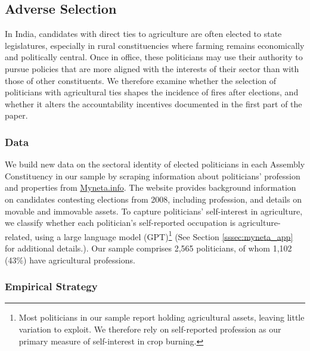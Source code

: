 \documentclass[12pt]{article}
\begin{document}
 \subsection{Adverse Selection}

 
In India, candidates with direct ties to agriculture are often elected to state legislatures, especially in rural constituencies where farming remains economically and politically central. Once in office, these politicians may use their authority to pursue policies that are more aligned with the interests of their sector than with those of other constituents. We therefore examine whether the selection of politicians with agricultural ties shapes the incidence of fires after elections, and whether it alters the accountability incentives documented in the first part of the paper. 

 \subsubsection{Data}

 We build new data on the sectoral identity of elected politicians in each Assembly Constituency in our sample by scraping information about politicians' profession and properties from \href{https://www.myneta.info/}{Myneta.info}. The website provides background information on candidates contesting elections from 2008, including profession, and details on movable and immovable assets. To capture politicians' self-interest in agriculture, we classify whether each politician's self-reported occupation is agriculture-related, using a large language model (GPT)\footnote{Most politicians in our sample report holding agricultural assets, leaving little variation to exploit. We therefore rely on self-reported profession as our primary measure of self-interest in crop burning.} (See Section \ref{sssec:myneta_app} for additional details.).
Our sample comprises 2,565 politicians, of whom 1,102 (43\%) have agricultural professions.  %

\subsubsection{Empirical Strategy \label{sssec:empirics3}}
\end{document}
